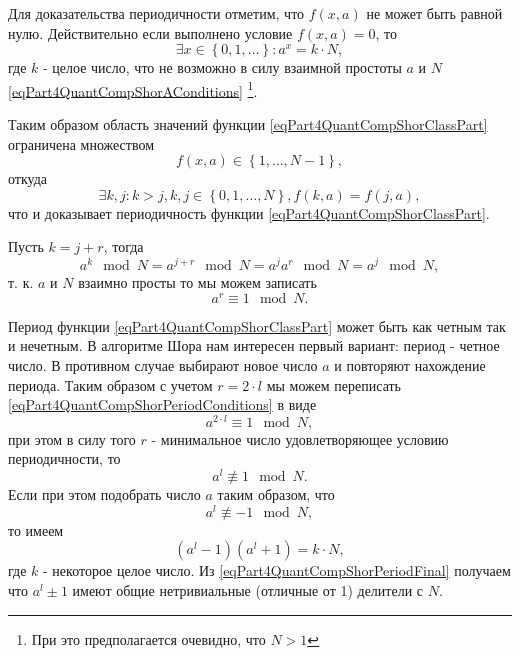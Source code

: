 Для доказательства периодичности отметим, что $f\left(x, a\right)$ не
может быть равной нулю. Действительно если выполнено условие
$f\left(x, a\right) = 0$, то 
\[
\exists x \in \left\{0, 1, \dots\right\}:
a^x = k \cdot N,
\]
где $k$ - целое число, что не возможно в силу
взаимной простоты $a$ и $N$ \eqref{eqPart4QuantCompShorAConditions}
\footnote{При это предполагается очевидно, что $N > 1$}.

Таким образом область значений функции
\eqref{eqPart4QuantCompShorClassPart} ограничена множеством 
\begin{equation}
f\left(x,
a\right) \in \left\{1, \dots, N - 1\right\},
\nonumber
\end{equation}
откуда 
\begin{equation}
\exists k,j: k > j, k,j \in \left\{0, 1, \dots, N\right\},
f\left(k,a\right) = f\left(j,a\right),
\nonumber
\end{equation}
что и доказывает периодичность функции \eqref{eqPart4QuantCompShorClassPart}.

Пусть $k = j + r$, тогда
\[
a^k \mod{N} = a^{j + r} \mod{N} = a^j a^r \mod{N}= a^j \mod{N},
\]
т. к. $a$ и $N$ взаимно просты то мы можем записать
\begin{equation}
a^r \equiv 1 \mod{N}.
\label{eqPart4QuantCompShorPeriodConditions}
\end{equation}


Период функции \eqref{eqPart4QuantCompShorClassPart} может быть как
четным так и нечетным. В алгоритме Шора нам интересен первый вариант:
период - четное число. В противном случае выбирают новое число $a$ и
повторяют нахождение периода. Таким образом с учетом $r= 2\cdot l$ мы
можем переписать \eqref{eqPart4QuantCompShorPeriodConditions} в виде
\begin{equation}
a^{2 \cdot l} \equiv 1 \mod{N},
\nonumber
\end{equation}
при этом в силу того $r$ - минимальное число удовлетворяющее условию
периодичности, то
\[
a^{l} \not\equiv 1 \mod{N}.
\]
Если при этом подобрать число $a$ таким образом, что 
\[
a^{l} \not\equiv -1 \mod{N},
\]
то имеем 
\begin{equation}
\left(a^l - 1\right)\left(a^l + 1\right) = k \cdot N,
\label{eqPart4QuantCompShorPeriodFinal}
\end{equation}
где $k$ - некоторое целое число. Из
\eqref{eqPart4QuantCompShorPeriodFinal} получаем что $a^l \pm 1$ имеют
общие нетривиальные (отличные от 1) делители с $N$.


